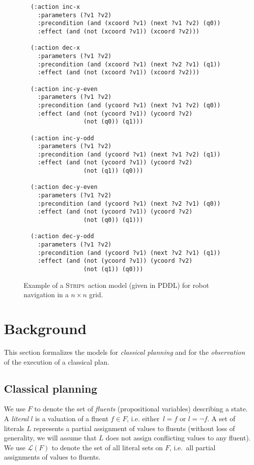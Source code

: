 \documentclass[letterpaper]{article} %
\newcommand{\strips}{\textsc{Strips}}     %
\begin{document}
\begin{figure}
  \begin{tiny}
  \begin{verbatim}
  (:action inc-x
    :parameters (?v1 ?v2)
    :precondition (and (xcoord ?v1) (next ?v1 ?v2) (q0))
    :effect (and (not (xcoord ?v1)) (xcoord ?v2)))

  (:action dec-x
    :parameters (?v1 ?v2)
    :precondition (and (xcoord ?v1) (next ?v2 ?v1) (q1))
    :effect (and (not (xcoord ?v1)) (xcoord ?v2)))

  (:action inc-y-even
    :parameters (?v1 ?v2)
    :precondition (and (ycoord ?v1) (next ?v1 ?v2) (q0))
    :effect (and (not (ycoord ?v1)) (ycoord ?v2)
                 (not (q0)) (q1)))

  (:action inc-y-odd
    :parameters (?v1 ?v2)
    :precondition (and (ycoord ?v1) (next ?v1 ?v2) (q1))
    :effect (and (not (ycoord ?v1)) (ycoord ?v2)
                 (not (q1)) (q0)))

  (:action dec-y-even
    :parameters (?v1 ?v2)
    :precondition (and (ycoord ?v1) (next ?v2 ?v1) (q0))
    :effect (and (not (ycoord ?v1)) (ycoord ?v2)
                 (not (q0)) (q1)))

  (:action dec-y-odd
    :parameters (?v1 ?v2)
    :precondition (and (ycoord ?v1) (next ?v2 ?v1) (q1))
    :effect (and (not (ycoord ?v1)) (ycoord ?v2)
                 (not (q1)) (q0)))
  \end{verbatim}           
  \end{tiny}  
 \caption{\small Example of a \strips\ action model (given in PDDL) for robot navigation in a $n\times n$ grid.}
\label{fig:model-example}
\end{figure}



\section{Background}
\label{sec:background}
This section formalizes the models for {\em classical planning} and for the {\em observation} of the execution of a classical plan.

\subsection{Classical planning}
We use $F$ to denote the set of {\em fluents} (propositional variables) describing a state. A {\em literal} $l$ is a valuation of a fluent $f\in F$, i.e. either~$l=f$ or $l=\neg f$. A set of literals $L$ represents a partial assignment of values to fluents (without loss of generality, we will assume that $L$ does not assign conflicting values to any fluent). We use $\mathcal{L}(F)$ to denote the set of all literal sets on $F$, i.e.~all partial assignments of values to fluents.
\end{document}
